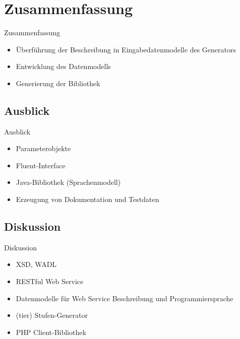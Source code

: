 \section{Zusammenfassung}

\begin{frame}{Zusammenfassung}
    \begin{itemize}
        \item Überführung der Beschreibung in Eingabedatenmodelle des Generators
        \item Entwicklung des Datenmodells
        \item Generierung der Bibliothek
    \end{itemize}
\end{frame}

\subsection{Ausblick}
\begin{frame}{Ausblick}
    \begin{itemize}
        \item Parameterobjekte
        \item Fluent-Interface
        \item Java-Bibliothek (Sprachenmodell)
        \item Erzeugung von Dokumentation und Testdaten
    \end{itemize}
\end{frame}

\subsection{Diskussion}
\begin{frame}{Diskussion}
    \begin{itemize}
        \item XSD, WADL
        \item RESTful Web Service
        \item Datenmodelle für Web Service Beschreibung und Programmiersprache
        \item (tier) Stufen-Generator   
        \item PHP Client-Bibliothek
    \end{itemize}
\end{frame}